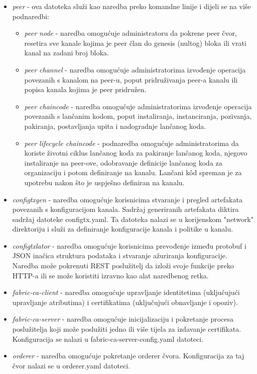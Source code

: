\documentclass[times, utf8, diplomski]{fer}
\begin{document}
\begin{itemize}
\item \textit{peer} - ova datoteka služi kao naredba preko komandne linije i dijeli se na više podnaredbi:
	\begin{itemize}
	\item \textit{peer node} - naredba omogućuje administratoru da pokrene peer čvor, resetira sve kanale kojima je peer član do genesis (nultog) bloka ili vrati kanal na zadani broj bloka.
	\item \textit{peer channel} - naredba omogućuje administratorima 			izvođenje operacija povezanih s kanalom na peer-u, poput pridruživanja peer-a kanalu ili popisa kanala kojima je peer pridružen.
	\item \textit{peer chaincode} - naredba omogućuje administratorima izvođenje operacija povezanih s lančanim kodom, poput instaliranja, instanciranja, pozivanja, pakiranja, postavljanja upita i nadogradnje lančanog koda.
	\item \textit{peer lifecycle chaincode} - podnaredba omogućuje administratorima da koriste životni ciklus lančanog koda za pakiranje lančanog koda, njegovo instaliranje na peer-ove, odobravanje definicije lančanog koda za organizaciju i potom definiranje na kanalu. Lančani kôd spreman je za upotrebu nakon što je uspješno definiran na kanalu.
	\end{itemize}
	
\item \textit{configtxgen} - naredba omogućuje korisnicima stvaranje i pregled artefakata povezanih s konfiguracijom kanala. Sadržaj generiranih artefakata diktira sadržaj datoteke configtx.yaml. Ta datoteka nalazi se u korijenskom "network" direktoriju i služi za definiranje konfiguracije kanala i politike u kanalu.

\item \textit{configtxlator} - naredba omogućuje korisnicima prevođenje između protobuf i JSON inačica struktura podataka i stvaranje ažuriranja konfiguracije. Naredba može pokrenuti REST poslužitelj da izloži svoje funkcije preko HTTP-a ili se može koristiti izravno kao alat naredbenog retka.

\item \textit{fabric-ca-client} - naredba omogućuje upravljanje identitetima (uključujući upravljanje atributima) i certifikatima (uključujući obnavljanje i opoziv). 

\item \textit{fabric-ca-server} - naredba omogućuje inicijalizaciju i pokretanje procesa poslužitelja koji može poslužiti jedno ili više tijela za izdavanje certifikata. Konfiguracija se nalazi u fabric-ca-server-config.yaml datoteci.

\item \textit{orderer} - naredba omogućuje pokretanje orderer čvora. Konfiguracija za taj čvor nalazi se u orderer.yaml datoteci.

\end{itemize}
\end{document}
